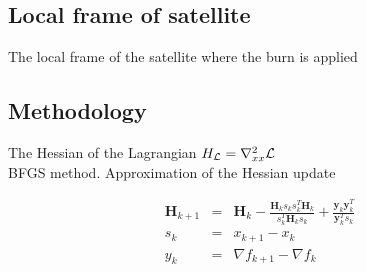 \documentclass[Space3_Assign3.tex]{subfile}
\begin{document}
\subsection{Local frame of satellite}
The local frame of the satellite where the burn is applied 




\subsection{Methodology}






The Hessian of the Lagrangian $H_{\mathcal{L}} = \nabla^2_{xx}\mathcal{L}$\\
BFGS method. Approximation of the Hessian update

\begin{eqnarray}
\bm{H}_{k+1} &=& \bm{H}_k - \frac{\bm{H}_k s_k s_k^T \bm{H}_k}{s_k^T \bm{H}_k s_k} + \frac{\bm{y}_k\bm{y}_k^T}{\bm{y}_k^T s_k}\\
s_k &=& x_{k+1} - x_k\\
y_k &=& \nabla f_{k+1} - \nabla f_k
\end{eqnarray}
\end{document}
